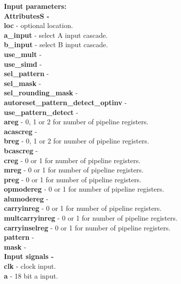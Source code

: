             {\bf Input parameters:} \\
            {\bf AttributesS -} \\
            {\bf loc} - optional location. \\
            {\bf a\_input} - select A input cascade. \\
            {\bf b\_input} - select B input cascade. \\
            {\bf use\_mult} -  \\
            {\bf use\_simd} -  \\
            {\bf sel\_pattern} -  \\
            {\bf sel\_mask} -  \\
            {\bf sel\_rounding\_mask} -  \\
            {\bf autoreset\_pattern\_detect\_optinv} -  \\
            {\bf use\_pattern\_detect     } -  \\       
            {\bf areg} - 0, 1 or 2 for number of pipeline registers. \\
            {\bf acascreg} -  \\
            {\bf breg} - 0, 1 or 2 for number of pipeline registers. \\
            {\bf bcascreg} -  \\
            {\bf creg} - 0 or 1 for number of pipeline registers. \\
            {\bf mreg} - 0 or 1 for number of pipeline registers. \\
            {\bf preg} - 0 or 1 for number of pipeline registers. \\
            {\bf opmodereg} - 0 or 1 for number of pipeline registers. \\
            {\bf alumodereg} -  \\
            {\bf carryinreg} - 0 or 1 for number of pipeline registers. \\
            {\bf multcarryinreg} - 0 or 1 for number of pipeline registers. \\
            {\bf carryinselreg} - 0 or 1 for number of pipeline registers. \\
            {\bf pattern} -  \\
            {\bf mask} -  \\
            {\bf Input signals -} \\
            {\bf clk} - clock input. \\
            {\bf a} - 18 bit a input.\\
